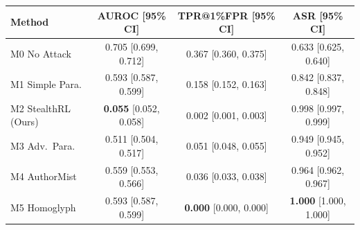 \begin{tabular}{lccc}
\toprule
Method & AUROC [95\% CI] & TPR@1\%FPR [95\% CI] & ASR [95\% CI] \\
\midrule
M0 No Attack & 0.705 [0.699, 0.712] & 0.367 [0.360, 0.375] & 0.633 [0.625, 0.640] \\
M1 Simple Para. & 0.593 [0.587, 0.599] & 0.158 [0.152, 0.163] & 0.842 [0.837, 0.848] \\
M2 StealthRL (Ours) & \textbf{0.055} [0.052, 0.058] & 0.002 [0.001, 0.003] & 0.998 [0.997, 0.999] \\
M3 Adv.\ Para. & 0.511 [0.504, 0.517] & 0.051 [0.048, 0.055] & 0.949 [0.945, 0.952] \\
M4 AuthorMist & 0.559 [0.553, 0.566] & 0.036 [0.033, 0.038] & 0.964 [0.962, 0.967] \\
M5 Homoglyph & 0.593 [0.587, 0.599] & \textbf{0.000} [0.000, 0.000] & \textbf{1.000} [1.000, 1.000] \\
\bottomrule
\end{tabular}
